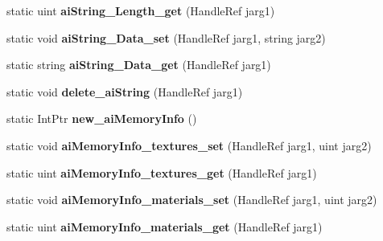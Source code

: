 \begin{DoxyCompactItemize}
\item 
\hypertarget{class_assimp_p_i_n_v_o_k_e_a7bb986621b98701d95333f1074c32aa7}{static uint {\bfseries ai\+String\+\_\+\+Length\+\_\+get} (Handle\+Ref jarg1)}\label{class_assimp_p_i_n_v_o_k_e_a7bb986621b98701d95333f1074c32aa7}

\item 
\hypertarget{class_assimp_p_i_n_v_o_k_e_a95102ce556142560791d4ff974c4acab}{static void {\bfseries ai\+String\+\_\+\+Data\+\_\+set} (Handle\+Ref jarg1, string jarg2)}\label{class_assimp_p_i_n_v_o_k_e_a95102ce556142560791d4ff974c4acab}

\item 
\hypertarget{class_assimp_p_i_n_v_o_k_e_a76bd0b0cd5bad2c315823608f6b3f43a}{static string {\bfseries ai\+String\+\_\+\+Data\+\_\+get} (Handle\+Ref jarg1)}\label{class_assimp_p_i_n_v_o_k_e_a76bd0b0cd5bad2c315823608f6b3f43a}

\item 
\hypertarget{class_assimp_p_i_n_v_o_k_e_a2426bb25fb31bf675e538c05f8eae429}{static void {\bfseries delete\+\_\+ai\+String} (Handle\+Ref jarg1)}\label{class_assimp_p_i_n_v_o_k_e_a2426bb25fb31bf675e538c05f8eae429}

\item 
\hypertarget{class_assimp_p_i_n_v_o_k_e_acfc6a8a609770fc1efac549b22528a52}{static Int\+Ptr {\bfseries new\+\_\+ai\+Memory\+Info} ()}\label{class_assimp_p_i_n_v_o_k_e_acfc6a8a609770fc1efac549b22528a52}

\item 
\hypertarget{class_assimp_p_i_n_v_o_k_e_af7a1a652dbb09d715d100424dab1c752}{static void {\bfseries ai\+Memory\+Info\+\_\+textures\+\_\+set} (Handle\+Ref jarg1, uint jarg2)}\label{class_assimp_p_i_n_v_o_k_e_af7a1a652dbb09d715d100424dab1c752}

\item 
\hypertarget{class_assimp_p_i_n_v_o_k_e_a4c716d24813e4af07e5b24132231062c}{static uint {\bfseries ai\+Memory\+Info\+\_\+textures\+\_\+get} (Handle\+Ref jarg1)}\label{class_assimp_p_i_n_v_o_k_e_a4c716d24813e4af07e5b24132231062c}

\item 
\hypertarget{class_assimp_p_i_n_v_o_k_e_a02e8de069512132ccd6223aa84998a75}{static void {\bfseries ai\+Memory\+Info\+\_\+materials\+\_\+set} (Handle\+Ref jarg1, uint jarg2)}\label{class_assimp_p_i_n_v_o_k_e_a02e8de069512132ccd6223aa84998a75}

\item 
\hypertarget{class_assimp_p_i_n_v_o_k_e_a2083f1504927daef22815f0f98790d8b}{static uint {\bfseries ai\+Memory\+Info\+\_\+materials\+\_\+get} (Handle\+Ref jarg1)}\label{class_assimp_p_i_n_v_o_k_e_a2083f1504927daef22815f0f98790d8b}


\end{DoxyCompactItemize}
